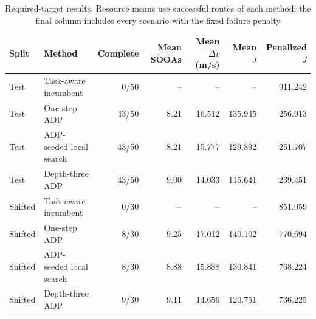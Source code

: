 \begin{table}[t]
  \centering
  \caption{Required-target results. Resource means use successful routes of each method; the final column includes every scenario with the fixed failure penalty}
  \label{tab:paired-aggregate}
  \renewcommand{\arraystretch}{1.08}
  \setlength{\tabcolsep}{5pt}
  \footnotesize
  \begin{tabular*}{\linewidth}{@{\extracolsep{\fill}}llrrrrr@{}}
    \toprule
    Split & Method & Complete & Mean SOOAs & Mean $\Delta v$ (m/s) & Mean $J$ & Penalized $J$ \\
    \midrule
    Test & Task-aware incumbent & 0/50 & -- & -- & -- & 911.242 \\
    Test & One-step ADP & 43/50 & 8.21 & 16.512 & 135.945 & 256.913 \\
    Test & ADP-seeded local search & 43/50 & 8.21 & 15.777 & 129.892 & 251.707 \\
    Test & Depth-three ADP & 43/50 & 9.00 & 14.033 & 115.641 & 239.451 \\
    Shifted & Task-aware incumbent & 0/30 & -- & -- & -- & 851.059 \\
    Shifted & One-step ADP & 8/30 & 9.25 & 17.012 & 140.102 & 770.694 \\
    Shifted & ADP-seeded local search & 8/30 & 8.88 & 15.888 & 130.841 & 768.224 \\
    Shifted & Depth-three ADP & 9/30 & 9.11 & 14.656 & 120.751 & 736.225 \\
    \bottomrule
  \end{tabular*}
\end{table}
